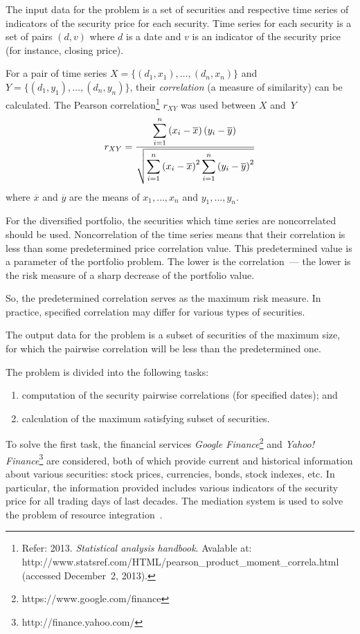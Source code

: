 \begin{multicols}{2}
{  The input data for the problem is a set of securities and respective time series of
indicators of the security price for each security. Time series for each security is a set
of pairs $(d, v)$ where $d$ is a date and $v$ is an indicator of the security price (for
instance, closing price).

For a pair of time series $X =\{(d_1, x_1), \ldots , (d_n, x_n)\}$ and
$Y = \{(d_1, y_1), \ldots  ,
(d_n, y_n)\}$, their \textit{correlation} (a measure of similarity) can be calculated. 
The Pearson
correlation\footnote{Refer:  2013. \textit{Statistical analysis handbook}.
Avalable at: {\sf
http://www.statsref.com/HTML/pearson\_product\_\linebreak moment\_correla.html} (accessed December~2, 2013).}  $r_{XY}$
was used between $X$ and~$Y$
$$
r_{XY} = \displaystyle\frac{\displaystyle \sum\limits_{i=1}^n \left( x_i-\overline{x}\right) \left( y_i-
\overline{y}\right)\mathstrut}{\displaystyle \sqrt{\sum\limits_{i=1}^n \left(  x_i-\overline{x}\right)^2
\sum\limits_{i=1}^n \left( y_i-\overline{y}\right)^2}\mathstrut}
  $$
  where $\overline{x}$ and $\overline{y}$ are the means of $x_1, \ldots ,
x_n$ and $y_1, \ldots , y_n$.

  For the diversified portfolio, the securities which time series are noncorrelated
should be used. Noncorrelation of the time series means that their correlation is less
than some predetermined price correlation value. This predetermined value is a
parameter of the portfolio problem. The lower is the correlation~--- the lower is the
risk measure of a sharp decrease of the portfolio value. 

So, the predetermined
correlation serves as the maximum risk measure. In practice, specified correlation
may differ for various types of securities.

  The output data for the problem is a subset of securities of the maximum size, for
which the pairwise correlation will be less than the predetermined one.


  The problem is divided into the following tasks:
  \begin{enumerate}[(1)]
\item computation of the security pairwise correlations (for specified dates); and
\item calculation of the maximum satisfying subset of securities.
\end{enumerate}

  To solve the first task, the financial services \textit{Google Finance}\footnote{{\sf
https://www.google.com/finance}} and \textit{Yahoo! Finance}\footnote{{\sf
http://finance.yahoo.com/}} are considered, both of which provide current and
historical information about various securities: stock prices, currencies, bonds, stock
indexes, etc. In particular, the information provided includes various indicators of the
security price for all trading days of last decades.  The mediation system is used to
solve the problem of resource integration~\cite{5-kal}.

}
\end{multicols}
